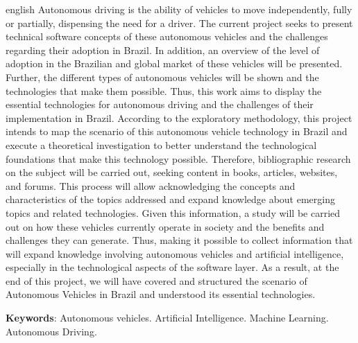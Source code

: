 \documentclass[
	12pt,				%
	openright,			%
	twoside,			%
	a4paper,			%
	english,			%
	french,				%
	spanish,			%
	brazil				%
	]{abntex2}
\begin{document}
\begin{resumo}[Abstract]
	\begin{otherlanguage*}{english}
		Autonomous driving is the ability of vehicles to move independently, fully or partially, dispensing the need for a driver. The current project seeks to present technical software concepts of these autonomous vehicles and the challenges regarding their adoption in Brazil. In addition, an overview of the level of adoption in the Brazilian and global market of these vehicles will be presented. Further, the different types of autonomous vehicles will be shown and the technologies that make them possible. Thus, this work aims to display the essential technologies for autonomous driving and the challenges of their implementation in Brazil. According to the exploratory methodology, this project intends to map the scenario of this autonomous vehicle technology in Brazil and execute a theoretical investigation to better understand the technological foundations that make this technology possible. Therefore, bibliographic research on the subject will be carried out, seeking content in books, articles, websites, and forums. This process will allow acknowledging the concepts and characteristics of the topics addressed and expand knowledge about emerging topics and related technologies. Given this information, a study will be carried out on how these vehicles currently operate in society and the benefits and challenges they can generate. Thus, making it possible to collect information that will expand knowledge involving autonomous vehicles and artificial intelligence, especially in the technological aspects of the software layer. As a result, at the end of this project, we will have covered and structured the scenario of Autonomous Vehicles in Brazil and understood its essential technologies.

		\vspace{\onelineskip}

		\noindent
		\textbf{Keywords}: Autonomous vehicles. Artificial Intelligence. Machine Learning. Autonomous Driving.
	\end{otherlanguage*}
\end{resumo}


\listoftables*
\cleardoublepage
\end{document}
